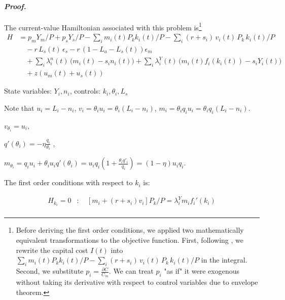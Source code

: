 \documentclass[12pt]{article} %
\theoremstyle{definition}
\begin{document}
\paragraph{\textit{Proof.}} The current-value Hamiltonian associated with this problem is\footnote{ Before deriving the first order conditions, we applied two mathematically equivalent transformations to the objective function. First, following \cite{acemoglu1999holdups}, we rewrite the capital cost $I(t)$ into $ \sum_i m_i(t) P_k k_i(t)/P - \sum_i (r+s_i)\,v_i(t)\,P_k\,k_i(t)/P $ in the integral. Second, we substitute $p_i = \frac{\partial C}{C_m}$. We can treat $p_i$ "as if" it were exogenous without taking its derivative with respect to control variables due to envelope theorem. }
\begin{align}
H &= p_mY_m/P +p_sY_s/P - \sum_i m_i(t) P_k k_i(t)/P - \sum_i (r+s_i)\,v_i(t)\,P_k\,k_i(t)/P \\
&\quad - r\,L_s(t)\,\epsilon_s
- r\,(1-L_a - L_s(t))\epsilon_m
\nonumber\\
&\quad
  +\sum_{i} \lambda_i^n(t)\,\bigl(m_i(t) - s_i n_i(t)\bigr) + \sum_{i} \lambda_i^Y(t)\,\bigl(m_i(t)f_i(k_i(t)) - s_i Y_i(t)\bigr)  \nonumber\\
 & \quad + z(u_m(t)+u_s(t))
\end{align}



State variables: $Y_i, n_i$, controls: $k_i, \theta_i, L_s$

Note that $u_i=L_i-n_i$, $v_i=\theta_iu_i = \theta_i(L_i-n_i)$, 
$m_i = \theta_iq_iu_i = \theta_i q_i (L_i-n_i)$.

$v_{\theta_i} = u_i  $, 

$q'(\theta_i)= -\eta \frac{q_i}{\theta_i}$ , 

$m_{\theta_i} = q_iu_i + \theta_iu_iq'(\theta_i)  =  u_iq_i (1   + \frac{\theta_i q'_i}{q_i} ) = (1-\eta) u_iq_i$.







The first order conditions with respect to $k_i$ is:

\begin{align}
    H_{k_i} =0&: \quad     [m_i+(r+s_i)v_i] P_k/P =\lambda^Y_i m_i f_i'(k_i)   \label{eq:H_ki}\\
\end{align}
\end{document}
